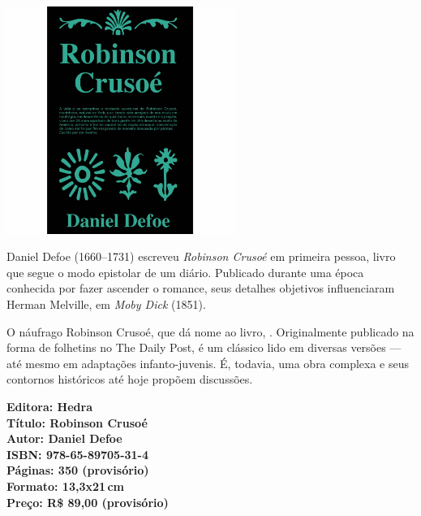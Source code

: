 \begin{center}
\hspace*{.5cm}\includegraphics[width=74mm]{./CAPAS/HEDRA_ROBINSON.jpg}
\end{center}
\hspace*{-7cm}\hrulefill\hspace*{-7cm}
\medskip

\noindent{}Daniel Defoe (1660--1731) escreveu \textit{Robinson Crusoé} em primeira pessoa, livro que segue o modo epistolar de um diário. Publicado durante uma época conhecida por fazer ascender o romance, seus detalhes objetivos influenciaram Herman Melville, em \textit{Moby Dick} (1851).

O náufrago Robinson Crusoé, que dá nome ao livro, . Originalmente publicado na forma de folhetins no The Daily Post, é um clássico lido em diversas versões --- até mesmo em adaptações infanto-juvenis. É, todavia, uma obra complexa e seus contornos históricos até hoje propõem discussões. 

\vfill
\noindent\begin{minipage}[c]{1\linewidth}
{\small\textbf{
\hspace*{-.1cm}Editora: Hedra\\
Título: Robinson Crusoé\\
Autor: Daniel Defoe\\ 
ISBN: 978-65-89705-31-4\\
Páginas: 350 (provisório)\\
Formato: 13,3x21\,cm\\
Preço: R\$ 89,00 (provisório)\\
}}
\end{minipage}
\pagebreak

